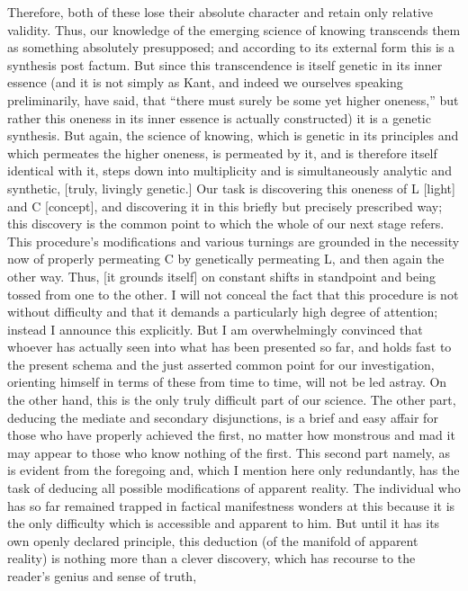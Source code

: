 Therefore, both of these lose their absolute character
and retain only relative validity.
Thus, our knowledge of the emerging
science of knowing transcends
them as something absolutely presupposed;
and according to its external form
this is a synthesis post factum.
But since this transcendence is
itself genetic in its inner essence
(and it is not simply as Kant,
and indeed we ourselves speaking preliminarily, have said,
that “there must surely be some yet higher oneness,”
but rather this oneness in its inner essence is
actually constructed)
it is a genetic synthesis.
But again, the science of knowing,
which is genetic in its principles
and which permeates the higher oneness,
is permeated by it,
and is therefore itself identical with it,
steps down into multiplicity and is
simultaneously analytic and synthetic,
[truly, livingly genetic.]
Our task is discovering this
oneness of L [light] and C [concept],
and discovering it in this briefly
but precisely prescribed way;
this discovery is the common point to which the
whole of our next stage refers.
This procedure's modifications
and various turnings are grounded in
the necessity now of properly permeating C
by genetically permeating L,
and then again the other way.
Thus, [it grounds itself] on
constant shifts in standpoint
and being tossed from one to the other.
I will not conceal the fact that
this procedure is not without difficulty
and that it demands a particularly
high degree of attention;
instead I announce this explicitly.
But I am overwhelmingly convinced
that whoever has actually seen into
what has been presented so far,
and holds fast to the present schema
and the just asserted common point for our investigation,
orienting himself in terms of these from time to time,
will not be led astray.
On the other hand,
this is the only truly difficult part of our science.
The other part,
deducing the mediate and secondary disjunctions,
is a brief and easy affair for those
who have properly achieved the first,
no matter how monstrous and mad
it may appear to those who know nothing of the first.
This second part namely,
as is evident from the foregoing
and, which I mention here only redundantly,
has the task of deducing all possible modifications
of apparent reality.
The individual who has so far remained trapped
in factical manifestness wonders at this
because it is the only difficulty
which is accessible and apparent to him.
But until it has its own openly declared principle,
this deduction (of the manifold of apparent reality) is
nothing more than a clever discovery,
which has recourse to the reader's genius and sense of truth,
